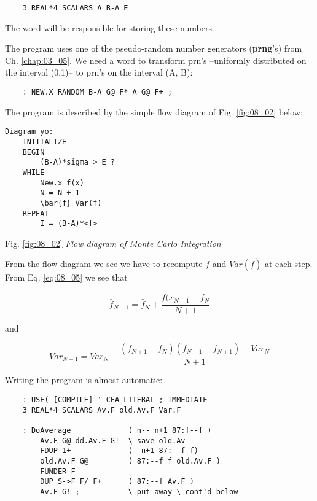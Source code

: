 \begin{lstlisting}
    3 REAL*4 SCALARS A B-A E
\end{lstlisting}

The word  will be responsible for storing these numbers.

The program uses one of the pseudo-random number generators (\textbf{prng}'s) from Ch. \ref{chap:03_05}. We need a word to transform prn's --uniformly distributed on the interval (0,1)-- to prn's on the interval (A, B):

\begin{lstlisting}
    : NEW.X RANDOM B-A G@ F* A G@ F+ ;
\end{lstlisting}

The program is described by the simple flow diagram of Fig. \label{fig:08_02} \ref{fig:08_02} below:

\begin{lstlisting}
Diagram yo:
    INITIALIZE
    BEGIN
        (B-A)*sigma > E ?
    WHILE
        New.x f(x)
        N = N + 1
        \bar{f} Var(f)
    REPEAT
        I = (B-A)*<f>
\end{lstlisting}

Fig. \ref{fig:08_02} \textit{Flow diagram of Monte Carlo Integration}

From the flow diagram we see we have to recompute $\bar{f}$ and $Var(\bar{f})$ at each step. From Eq. \ref{eq:08_05} we see that

\begin{equation*}
\bar{f}_{N+1} = \bar{f}_N + \frac{f(x_{N+1} - \bar{f}_{N}}{N + 1}
\end{equation*}

and

\begin{equation*}
Var_{N+1} = Var_{N} + \frac{(f_{N+1}-\bar{f}_{N})(f_{N+1} - \bar{f}_{N+1})-Var_{N}}{N+1}
\end{equation*}

Writing the program is almost automatic:

\begin{lstlisting}
    : USE( [COMPILE] ' CFA LITERAL ; IMMEDIATE
    3 REAL*4 SCALARS Av.F old.Av.F Var.F

    : DoAverage             ( n-- n+1 87:f--f )
        Av.F G@ dd.Av.F G!  \ save old.Av
        FDUP 1+             (--n+1 87:--f f)
        old.Av.F G@         ( 87:--f f old.Av.F )
        FUNDER F-
        DUP S->F F/ F+      ( 87:--f Av.F )
        Av.F G! ;           \ put away \ cont'd below
\end{lstlisting}

